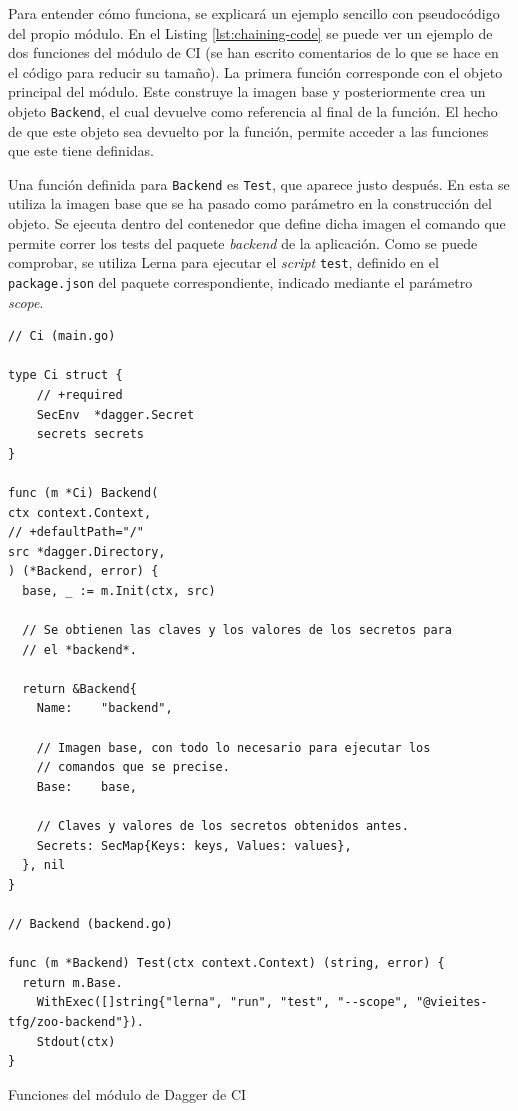 Para entender cómo funciona, se explicará un ejemplo sencillo con pseudocódigo del propio módulo. En el Listing \ref{lst:chaining-code} se puede ver un ejemplo de dos funciones del módulo de CI (se han escrito comentarios de lo que se hace en el código para reducir su tamaño). La primera función corresponde con el objeto principal del módulo. Este construye la imagen base y posteriormente crea un objeto \texttt{Backend}, el cual devuelve como referencia al final de la función. El hecho de que este objeto sea devuelto por la función, permite acceder a las funciones que este tiene definidas.

Una función definida para \texttt{Backend} es \texttt{Test}, que aparece justo después. En esta se utiliza la imagen base que se ha pasado como parámetro en la construcción del objeto. Se ejecuta dentro del contenedor que define dicha imagen el comando que permite correr los tests del paquete \textit{backend} de la aplicación. Como se puede comprobar, se utiliza Lerna para ejecutar el \textit{script} \texttt{test}, definido en el \texttt{package.json} del paquete correspondiente, indicado mediante el parámetro \textit{scope}.

\begin{longlisting}
  \begin{verbatim}
// Ci (main.go)

type Ci struct {
	// +required
	SecEnv  *dagger.Secret
	secrets secrets
}

func (m *Ci) Backend(
ctx context.Context,
// +defaultPath="/"
src *dagger.Directory,
) (*Backend, error) {
  base, _ := m.Init(ctx, src)

  // Se obtienen las claves y los valores de los secretos para
  // el *backend*.

  return &Backend{
    Name:    "backend",

    // Imagen base, con todo lo necesario para ejecutar los
    // comandos que se precise.
    Base:    base,

    // Claves y valores de los secretos obtenidos antes.
    Secrets: SecMap{Keys: keys, Values: values},
  }, nil
}

// Backend (backend.go)

func (m *Backend) Test(ctx context.Context) (string, error) {
  return m.Base.
    WithExec([]string{"lerna", "run", "test", "--scope", "@vieites-tfg/zoo-backend"}).
    Stdout(ctx)
}

\end{verbatim}
\caption{Funciones del módulo de Dagger de CI}
\label{lst:chaining-code}
\end{longlisting}

